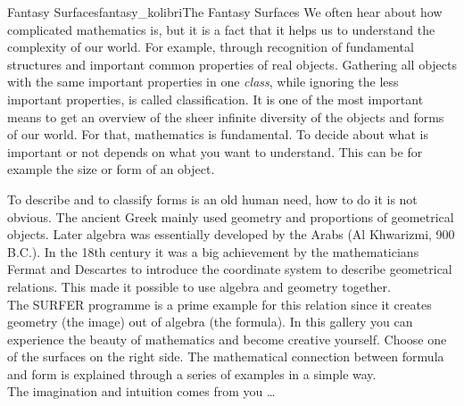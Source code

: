 \begin{surferIntroPage}{Fantasy Surfaces}{fantasy_kolibri}{The Fantasy Surfaces}
We often hear about how complicated mathematics is, but it is a fact that it helps us to understand the complexity of our world. For example, through recognition of fundamental structures and important common properties of real objects. Gathering all objects with the same important properties in one \textit{class}, while ignoring the less important properties, is called classification. It is one of the most important means to get an overview of the sheer infinite diversity of the objects and forms of our world. For that, mathematics is fundamental. To decide about what is important or not depends on what you want to understand. This can be for example the size or form of an object.
\\

\vspace{0.4cm}

To describe and to classify forms is an old human need, how to do it is not obvious. The ancient Greek mainly used geometry and proportions of geometrical objects. Later algebra was essentially developed by the Arabs (Al Khwarizmi, 900 B.C.). In the 18th century it was a big achievement by the mathematicians Fermat and Descartes to introduce the coordinate system to describe geometrical relations. This made it possible to use algebra and geometry together.
\\
\vspace{0.4cm}
The SURFER programme is a prime example for this relation since it creates geometry (the image) out of algebra (the formula).
In this gallery you can experience the beauty of mathematics and become creative yourself. Choose one of the surfaces on the right side. The mathematical connection between formula and form is explained through a series of examples in a simple way.\\
The imagination and intuition comes from you \dots
\end{surferIntroPage}
